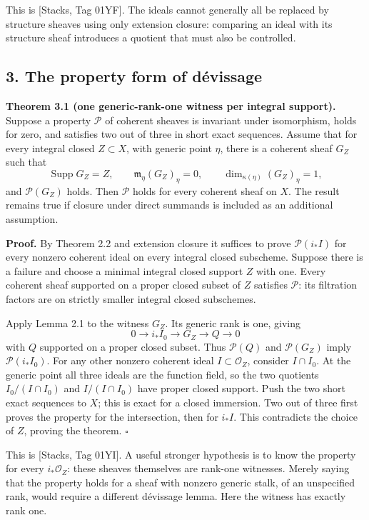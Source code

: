 \documentclass[11pt]{article}
\begin{document}
This is {[}Stacks, Tag 01YF{]}. The ideals cannot generally all be
replaced by structure sheaves using only extension closure: comparing an
ideal with its structure sheaf introduces a quotient that must also be
controlled.

\subsection{3. The property form of
dévissage}\label{the-property-form-of-duxe9vissage}

\textbf{Theorem 3.1 (one generic-rank-one witness per integral
support).} Suppose a property \(\mathcal P\) of coherent sheaves is
invariant under isomorphism, holds for zero, and satisfies two out of
three in short exact sequences. Assume that for every integral closed
\(Z\subset X\), with generic point \(\eta\), there is a coherent sheaf
\(G_Z\) such that \[
\operatorname{Supp}G_Z=Z,\qquad
\mathfrak m_\eta(G_Z)_\eta=0,\qquad
\dim_{\kappa(\eta)}(G_Z)_\eta=1,
\] and \(\mathcal P(G_Z)\) holds. Then \(\mathcal P\) holds for every
coherent sheaf on \(X\). The result remains true if closure under direct
summands is included as an additional assumption.

\textbf{Proof.} By Theorem 2.2 and extension closure it suffices to
prove \(\mathcal P(i_*I)\) for every nonzero coherent ideal on every
integral closed subscheme. Suppose there is a failure and choose a
minimal integral closed support \(Z\) with one. Every coherent sheaf
supported on a proper closed subset of \(Z\) satisfies \(\mathcal P\):
its filtration factors are on strictly smaller integral closed
subschemes.

Apply Lemma 2.1 to the witness \(G_Z\). Its generic rank is one, giving
\[
0\to i_*I_0\to G_Z\to Q\to0
\] with \(Q\) supported on a proper closed subset. Thus
\(\mathcal P(Q)\) and \(\mathcal P(G_Z)\) imply \(\mathcal P(i_*I_0)\).
For any other nonzero coherent ideal \(I\subset\mathcal O_Z\), consider
\(I\cap I_0\). At the generic point all three ideals are the function
field, so the two quotients \(I_0/(I\cap I_0)\) and \(I/(I\cap I_0)\)
have proper closed support. Push the two short exact sequences to \(X\);
this is exact for a closed immersion. Two out of three first proves the
property for the intersection, then for \(i_*I\). This contradicts the
choice of \(Z\), proving the theorem. \(\square\)

This is {[}Stacks, Tag 01YI{]}. A useful stronger hypothesis is to know
the property for every \(i_*\mathcal O_Z\): these sheaves themselves are
rank-one witnesses. Merely saying that the property holds for a sheaf
with nonzero generic stalk, of an unspecified rank, would require a
different dévissage lemma. Here the witness has exactly rank one.
\end{document}
